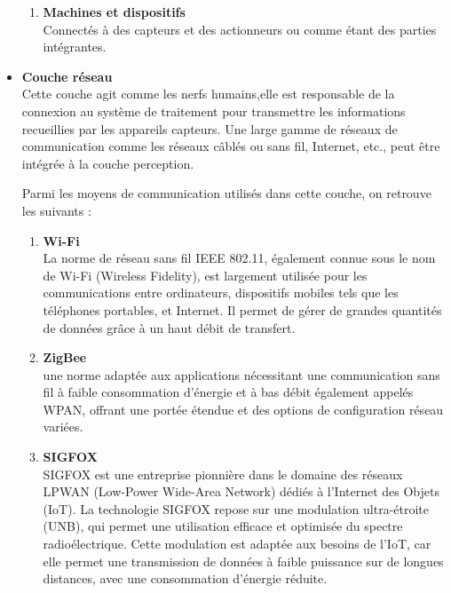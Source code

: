 \documentclass{report}
\begin{document}
\begin{itemize}
\begin{enumerate}
\item \textbf{Machines et dispositifs} \\
Connectés à des capteurs et des actionneurs ou comme étant des parties intégrantes.
\end{enumerate} 
\vspace*{0.5cm}
\item {\large\textbf{Couche réseau}} \\

Cette couche agit comme les nerfs humains,elle est responsable de la connexion au système de traitement pour transmettre les informations recueillies par les appareils capteurs. Une large gamme de réseaux de communication comme les réseaux câblés ou sans fil, Internet, etc., peut être intégrée à la couche perception.

Parmi les moyens de communication utilisés dans cette couche, on retrouve les suivants \cite{Bilal Benamrouche,2018} :
\begin{enumerate}
\item \textbf{Wi-Fi} \\
La norme de réseau sans fil IEEE 802.11, également connue sous le nom de Wi-Fi (Wireless Fidelity), est largement utilisée pour les communications entre ordinateurs, dispositifs mobiles tels que les téléphones portables, et Internet. Il permet de gérer de grandes quantités de données grâce à un haut débit de transfert.\\
\item \textbf{ZigBee} \\
une norme adaptée aux applications nécessitant une communication sans fil à faible consommation d'énergie et à bas débit  également appelés WPAN, offrant une portée étendue et des options de configuration réseau variées.

\item \textbf{SIGFOX} \\
SIGFOX est une entreprise pionnière dans le domaine des réseaux LPWAN (Low-Power Wide-Area Network) dédiés à l'Internet des Objets (IoT). 
La technologie SIGFOX repose sur une modulation ultra-étroite (UNB), qui permet une utilisation efficace et optimisée du spectre radioélectrique. Cette modulation est adaptée aux besoins de l'IoT, car elle permet une transmission de données à faible puissance sur de longues distances, avec une consommation d'énergie réduite. \\


\end{enumerate}
\end{itemize}
\end{document}
